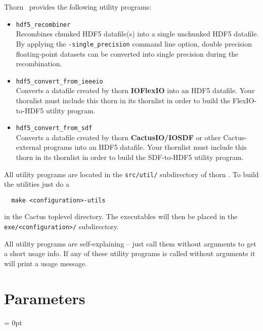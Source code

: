 \documentclass{article}
\newlength{\tableWidth} \newlength{\maxVarWidth} \newlength{\paraWidth} \newlength{\descWidth}
\begin{document}
Thorn \ThisThorn\ provides the following utility programs:
%
\begin{itemize}
  \item {\tt hdf5\_recombiner}\\
    Recombines chunked HDF5 datafile(s) into a single unchunked HDF5 datafile.
    By applying the {\tt -single\_precision} command line option,
    double precision floating-point datasets can be converted into single
    precision during the recombination.
  \item {\tt hdf5\_convert\_from\_ieeeio}\\
    Converts a datafile created by thorn {\bf IOFlexIO} into an HDF5 datafile. Your thornlist must include this thorn
    in its thornlist in order to build the FlexIO-to-HDF5 utility program.
  \item {\tt hdf5\_convert\_from\_sdf}\\
    Converts a datafile created by thorn {\bf CactusIO/IOSDF} or other Cactus-external programs into an HDF5 datafile. Your thornlist must include this thorn
    in its thornlist in order to build the SDF-to-HDF5 utility program.
\end{itemize}
%
All utility programs are located in the {\tt src/util/} subdirectory of thorn
\ThisThorn. To build the utilities just do a

\begin{verbatim}
  make <configuration>-utils
\end{verbatim}

in the Cactus toplevel directory. The executables will then be placed in the
{\tt exe/<configuration>/} subdirectory.

All utility programs are self-explaining -- just call them without arguments
to get a short usage info.
If any of these utility programs is called without arguments it will print
a usage message.




\section{Parameters} 


\parskip = 0pt

\setlength{\tableWidth}{160mm}

\setlength{\paraWidth}{\tableWidth}
\setlength{\descWidth}{\tableWidth}
\settowidth{\maxVarWidth}{strict\_io\_parameter\_check}
\end{document}

